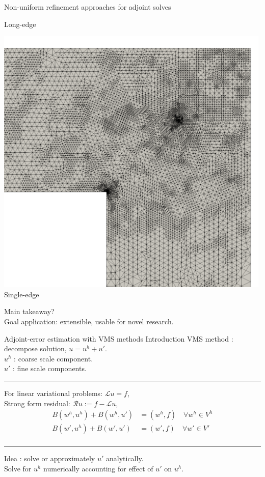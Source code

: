 \documentclass[fleqn]{beamer}
\begin{document}
\begin{frame}{Non-uniform refinement approaches for adjoint solves}
\begin{minipage}{0.33\textwidth}
Long-edge
\end{minipage}%
\begin{minipage}{0.33\textwidth}
\centering
\includegraphics[width=0.99\textwidth]{../img/refine_squarehole_single_close} \\
Single-edge
\end{minipage}

\vspace{1em}
Main takeaway? \\
Goal application: extensible, usable for novel research.
\end{frame}


\begin{frame}{Adjoint-error estimation with VMS methods}
{Introduction}
VMS method : decompose solution, $u = u^h + u'$. \\
$u^h$ : coarse scale component. \\
$u'$ : fine scale components. \\ [8pt]
\hrule
\vspace{1em}
For linear variational problems: $\mathcal{L} u  = f$, \\
Strong form residual: $\mathcal{R} u := f - \mathcal{L} u$,
%
\begin{equation*}
\begin{aligned}
B(w^h, u^h) + B(w^h, u') &= (w^h, f) \quad \forall w^h \in V^h \\
B(w', u^h) + B(w', u') &= (w', f) \quad \forall w' \in V' \\
\end{aligned}
\end{equation*}
\hrule
\vspace{1em}
Idea : solve or approximately $u'$ analytically. \\
Solve for $u^h$ numerically accounting for effect of $u'$
on $u^h.$
\end{frame}
\end{document}
